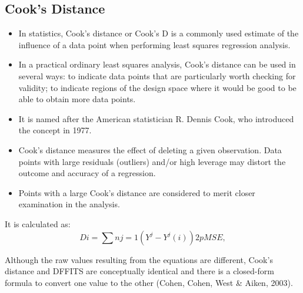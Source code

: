 \documentclass[residuals.tex]{subfiles}
\begin{document}
\subsection*{Cook's Distance}	
\begin{itemize}
\item In statistics, Cook's distance or Cook's D is a commonly used estimate of the influence of a data point when performing least squares regression analysis.

\item In a practical ordinary least squares analysis, Cook's distance can be used in several ways: to indicate data points that are particularly worth checking for validity; to indicate regions of the design space where it would be good to be able to obtain more data points. 
\item 
It is named after the American statistician R. Dennis Cook, who introduced the concept in 1977.
 
\item 
Cook's distance measures the effect of deleting a given observation. Data points with large residuals (outliers) and/or high leverage may distort the outcome and accuracy of a regression. 

\item Points with a large Cook's distance are considered to merit closer examination in the analysis. 

\end{itemize}
It is calculated as:
\[
 D i =∑ n j=1 (Y ^  j  −Y ^  j(i) ) 2  p MSE  , 
\]


Although the raw values resulting from the equations are different, Cook's distance and DFFITS are conceptually identical and there is a closed-form formula to convert one value to the other (Cohen, Cohen, West & Aiken, 2003).
\newpage
\end{document}
